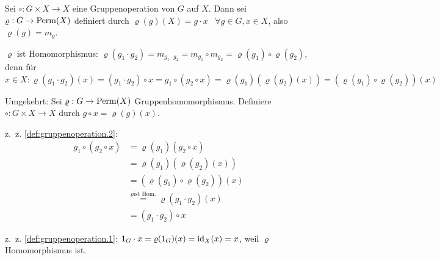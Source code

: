 \begin{beweis}
    \item Sei $\circ: G \times X \rightarrow X$ eine Gruppenoperation von $G$
          auf $X$. Dann sei $\varrho: G \rightarrow \operatorname{Perm}(X)$ definiert
          durch $\varrho(g)(X) = g \cdot x \;\;\; \forall g \in G, x \in X$,
          also $\varrho(g) = m_g$.

          $\varrho$ ist Homomorphismus: $\varrho(g_1 \cdot g_2) = m_{g_1 \cdot g_2} = m_{g_1} \circ m_{g_2} = \varrho(g_1) \circ \varrho(g_2)$,
          denn für $x \in X: \varrho(g_1 \cdot g_2) (x) = (g_1 \cdot g_2) \circ x = g_1 \circ (g_2 \circ x) = \varrho(g_1) (\varrho(g_2)(x)) = (\varrho(g_1) \circ \varrho (g_2)) (x)$

          Umgekehrt: Sei $\varrho: G \rightarrow \operatorname{Perm}(X)$ Gruppenhomomorphismus. Definiere $\circ: G \times X \rightarrow X$ durch $g \circ x = \varrho (g)(x)$.

          z.~z. \cref{def:gruppenoperation.2}: 
          \begin{align*}
            g_1 \circ (g_2 \circ x) &= \varrho (g_1) (g_2 \circ x)\\
            &= \varrho(g_1) (\varrho(g_2)(x))\\
            &= (\varrho(g_1) \circ \varrho(g_2))(x)\\
            &\overset{\varrho \text {ist Hom.}}{=} \varrho(g_1 \cdot g_2) (x)\\
            &= (g_1 \cdot g_2) \circ x
          \end{align*}

            z.~z. \cref{def:gruppenoperation.1}: 
            $1_G \cdot x = \varrho(1_G)(x) = \textnormal{id}_X(x) = x$, weil $\varrho$ Homomorphismus ist.
\end{beweis}


